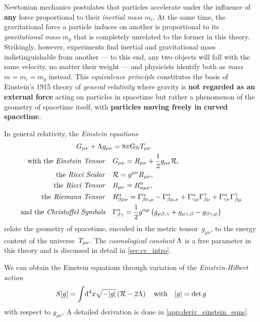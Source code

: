 \documentclass[parskip=half]{scrreprt}
\begin{document}
Newtonian mechanics postulates that particles accelerate under the influence of \textbf{any} force proportional to their \emph{inertial mass} \(m_i\). At the same time, the gravitational force a particle induces on another is proportional to its \emph{gravitational mass} \(m_g\) that is completely unrelated to the former in this theory. Strikingly, however, experiments find inertial and gravitational mass indistinguishable from another  --- to this end, any two objects will fall with the same velocity, no matter their weight --- and physicists identify both as \emph{mass} \(m=m_i=m_g\) instead. This \emph{equivalence principle} constitutes the basis of Einstein's 1915 theory of \emph{general relativity} where gravity is \textbf{not regarded as an external force} acting on particles in spacetime but rather a phenomenon of the geometry of spacetime itself, with \textbf{particles moving freely in curved spacetime}.

In general relativity, the \emph{Einstein equations}
\begin{align}\label{eq:einstein_eqns}
	\Gtens_{\mu \nu} + \cosmconst g_{\mu\nu} &= 8 \pi \Newtconst \Ttens_{\mu \nu} \\
	\text{with the \emph{Einstein Tensor}} \quad &\Gtens_{\mu \nu} = \Rtens_{\mu \nu} + \frac{1}{2}g_{\mu \nu}\Rscal \eqpunct{,} \label{eq:einstein_tensor} \\
	\text{the \emph{Ricci Scalar}} \quad &\Rscal = g^{\mu \nu}\Rtens_{\mu \nu} \eqpunct{,} \\
	\text{the \emph{Ricci Tensor}} \quad &\Rtens_{\mu \nu} = \Riemtens^\alpha_{\alpha \mu \nu} \eqpunct{,} \\
	\text{the \emph{Riemann Tensor}} \quad &\Riemtens^\alpha_{\beta \mu \nu} = \Gamma^\alpha_{\beta \nu, \mu} - \Gamma^\alpha_{\beta \mu, \nu} + \Gamma^\alpha_{\gamma \mu}\Gamma^\gamma_{\beta \nu} + \Gamma^\alpha_{\gamma \nu}\Gamma^\gamma_{\beta \mu} \\
	\text{and the \emph{Christoffel Symbols}} \quad &\Gamma^\alpha_{\beta \gamma} = \frac{1}{2} g^{\alpha \mu} \del{g_{\mu \beta, \gamma} + g_{\mu \gamma, \beta} - g_{\beta \gamma, \mu}}
\end{align}
relate the geometry of spacetime, encoded in the metric tensor~\(g_{\mu \nu}\), to the energy content of the universe~\(T_{\mu \nu}\). The \emph{cosmological constant} \(\Lambda\) is a free parameter in this theory and is discussed in detail in \autoref{sec:cc_intro}.

We can obtain the Einstein equations through variation of the \emph{Einstein-Hilbert action}
\begin{align}\label{eq:einstein_hilbert_action}
	S[g] = \int \! \dif{^4x} \sqrt{-\gdet} \del{\Rscal - 2\cosmconst} \quad \text{with} \quad \gdet = \det{g}
\end{align}
with respect to \(g_{\mu \nu}\). A detailed derivation is done in \autoref{app:deriv_einstein_eqns}.
\end{document}
